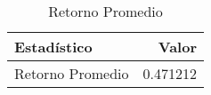 \begin{table}[H]
\label{tab:retorno_promedio}
\centering
\begin{tabular}{lr}
\toprule
Estad\'istico & Valor \\
\midrule
Retorno Promedio & 0.471212 \\
\bottomrule
\end{tabular}
\caption{Retorno Promedio}
\end{table}
